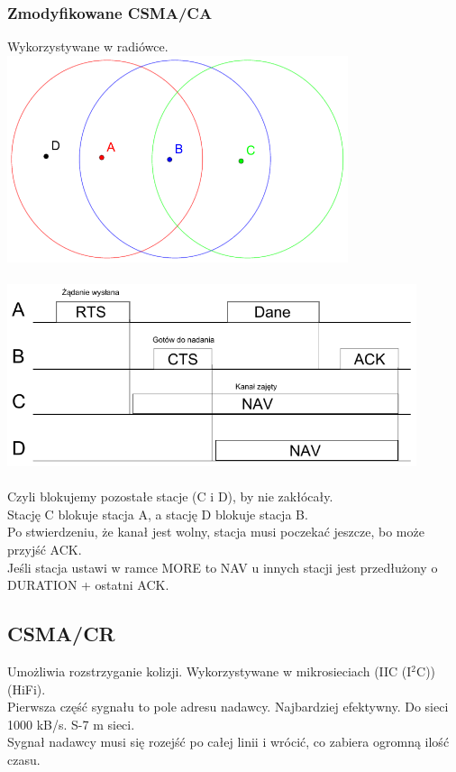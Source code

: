 \documentclass[a4paper,twoside]{article}
\begin{document}
	\subsubsection{Zmodyfikowane CSMA/CA}
		Wykorzystywane w radiówce.\\
		\includegraphics[width=10cm]{./images/image23.pdf}\\\\
		\includegraphics[width=12cm]{./images/image24.pdf}\\\\
		Czyli blokujemy pozostałe stacje (C i D), by nie zakłócały.\\
		Stację C blokuje stacja A, a stację D blokuje stacja B.\\
		Po stwierdzeniu, że kanał jest wolny, stacja musi poczekać jeszcze, bo może przyjść ACK.\\
		Jeśli stacja ustawi w ramce MORE to NAV u innych stacji jest przedłużony o DURATION + ostatni ACK.
	\subsection{CSMA/CR}
		Umożliwia rozstrzyganie kolizji. Wykorzystywane w mikrosieciach (IIC (I$ ^2 $C)) (HiFi).\\
		Pierwsza część sygnału to pole adresu nadawcy. Najbardziej efektywny. Do sieci 1000 kB/s. S-7 m sieci.\\
		Sygnał nadawcy musi się rozejść po całej linii i wrócić, co zabiera ogromną ilość czasu.
\end{document}
